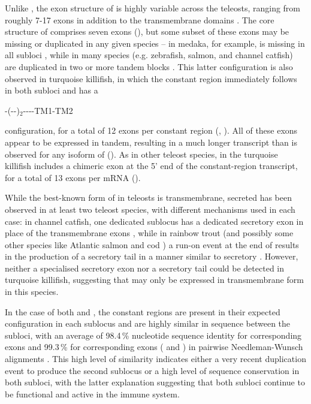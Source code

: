 		Unlike , the exon structure of  is highly variable across the teleosts, ranging from roughly 7-17 \cd{} exons in addition to the transmembrane domains \parencite{fillatreau2013astonishing}. The core structure of  comprises seven \cd{} exons (), but some subset of these exons may be missing or duplicated in any given species -- in medaka, for example,  is missing in all subloci \parencite{magadan2011medaka}, while in many species (e.g. zebrafish, salmon, and channel catfish)  are duplicated in two or more tandem blocks \parencite{fillatreau2013astonishing}. This latter configuration is also observed in turquoise killifish, in which the  constant region immediately follows  in both subloci and has a 

-(--)$_2$----TM1-TM2 

	\noindent configuration, for a total of 12 exons per  constant region (, ). All of these exons appear to be expressed in tandem, resulting in a much longer transcript than is observed for any isoform of  (). As in other teleost species,  in the turquoise killifish includes a chimeric  exon at the 5' end of the constant-region transcript, for a total of 13 exons per  mRNA ().

	While the best-known form of  in teleosts is transmembrane, secreted  has been observed in at least two teleost species, with different mechanisms used in each case: in channel catfish, one dedicated sublocus has a dedicated  secretory exon in place of the transmembrane exons \parencite{bengten2006catfish}, while in rainbow trout (and possibly some other species like Atlantic salmon and cod \parencite{ramirezgomez2012secretoryigd}) a run-on event at the end of  results in the production of a secretory tail in a manner similar to secretory  \parencite{ramirezgomez2012secretoryigd}. However, neither a specialised secretory exon nor a  secretory tail could be detected in turquoise killifish, suggesting that  may only be expressed in transmembrane form in this species.
	
	In the case of both  and , the constant regions are present in their expected configuration in each sublocus and are highly similar in sequence between the subloci, with an average of 98.4\,\% nucleotide sequence identity for corresponding  exons and 99.3\,\% for corresponding  exons ( and ) in pairwise Needleman-Wunsch alignments \parencite{needleman1970alignment}. This high level of similarity indicates either a very recent duplication event to produce the second sublocus or a high level of sequence conservation in both subloci, with the latter explanation suggesting that both subloci continue to be functional and active in the immune system.
	
